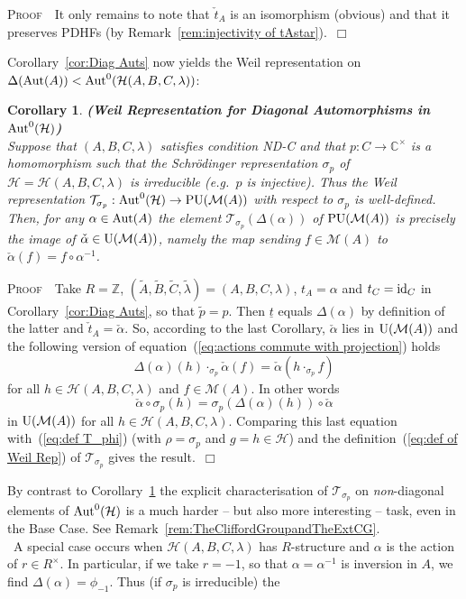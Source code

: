 \documentclass[12pt]{article}
\newtheorem{cor}{Corollary}[section]
\newcommand{\Aut}{{\rm Aut}}
\newcommand{\bbC}{\ensuremath{\mathbb{C}}}\newcommand{\bbCp}{\ensuremath{\mathbb{C}_p}}
\newcommand{\bbZ}{\ensuremath{\mathbb{Z}}}
\newcommand{\bPf}{\noindent \textsc{Proof\ }}
\newcommand{\cH}{\ensuremath{\mathcal{H}}}
\newcommand{\cM}{\mathcal{M}}
\newcommand{\cT}{\ensuremath{\mathcal{T}}}
\newcommand{\eg}{\emph{e.g.}}
\newcommand{\ePf}{~$\Box$\vertsp\par}%
\newcommand{\id}{{\rm id}}
\newcommand{\inv}{^{-1}}%
\renewcommand{\rem}{\refstepcounter{rem}\noindent{\sc Remark \therem}}
\renewcommand{\t}[1]{\tilde{#1}}
\renewcommand{\therem}{\thesection.\arabic{rem}}
\newcommand{\U}{{\rm U}}
\newcommand{\vertsp}{\vspace{1ex}}
\newcommand{\Hei}[4]{\cH({#1},{#2},{#3},{#4})}
\newcommand{\HeiStan}{\Hei{A}{B}{C}{\lambda}}
\begin{document}
\bPf\ It only remains to note that $\check t_A$ is an isomorphism (obvious) and that it preserves PDHFs (by Remark~\ref{rem:injectivity of tAstar}).\ePf
\noindent Corollary~\ref{cor:Diag Auts} now yields the Weil representation on $\Delta(\Aut(A))<\Aut^0(\HeiStan)$: 
\begin{cor}\label{cor: Weil Rep for Diag Auts}
	{\bf (Weil Representation for Diagonal Automorphisms in $\Aut^0(\cH)$)}\\
Suppose that $(A,B,C,\lambda)$ satisfies condition ND-C and  that $p:C\rightarrow\bbC^\times$ is a homomorphism such that the Schr\"odinger representation $\sigma_p$ of $\cH=\HeiStan$ is irreducible (\eg\ $p$ is injective). Thus the Weil representation $\cT_{\sigma_p}:\Aut^0(\cH)\rightarrow {\rm PU}(\cM(A))$ with respect to $\sigma_p$ is well-defined. Then, for any $\alpha\in \Aut(A)$ the element 
$
\cT_{\sigma_p}(\Delta(\alpha))
$ 
of ${\rm PU}(\cM(A))$ is precisely the image of $\check \alpha\in \U(\cM(A))$, namely the map sending $f\in\cM(A)$  to $\check \alpha(f)=f\circ\alpha\inv$. 
\end{cor}
\bPf\ Take $R=\bbZ$, 
$({\t A},{\t B},{\t C},{\t \lambda})=(A,B,C,\lambda)$,  $t_A=\alpha$ and  $t_C=\id_C$ in Corollary~\ref{cor:Diag Auts}, so that $\t p=p$. Then $\underline{t}$ equals $\Delta(\alpha)$ by definition of the latter and $\check t_A=\check\alpha$. So, according to the last Corollary, $\check \alpha$ lies in $\U(\cM(A))$ and the following version of equation~(\ref{eq:actions commute with projection}) holds 
\begin{equation}\label{eq:first of pf of  Weil Rep for Diag Auts}
	\Delta(\alpha)(h)\cdot_{\sigma_{p}} \check \alpha(f) =  \check \alpha (h\cdot_{\sigma_p} f)
\end{equation}
for all $h\in\HeiStan$ and $f\in\cM(A)$. In other words 
$$
 \check \alpha\circ\sigma_p(h)=\sigma_p(\Delta(\alpha)(h))
\circ \check \alpha
$$ 
in $\U(\cM(A))$ for all $h\in\HeiStan$.
Comparing this last equation with~(\ref{eq:def T_phi})  (with $\rho=\sigma_p$ and $g=h\in\cH$) and the definition~(\ref{eq:def of Weil Rep}) of $\cT_{\sigma_p}$  
gives the result.\ePf  
\noindent By contrast to Corollary~\ref{cor: Weil Rep for Diag Auts} the explicit characterisation of $\cT_{\sigma_p}$ on  \textit{non}-diagonal elements of 
$\Aut^0(\cH)$ is a much harder -- but also more interesting -- task, even in the Base Case. See Remark~\ref{rem:TheCliffordGroupandTheExtCG}.\bigskip\\
\rem\ A special case occurs when $\HeiStan$ has $R$-structure and $\alpha$ is the action of $r\in R^\times$. In particular, if we take  $r=-1$, so that $\alpha=\alpha\inv$ is inversion in $A$, we find  $\Delta(\alpha)=\phi_{-1}$. Thus (if $\sigma_p$ is irreducible) the  
\end{document}
